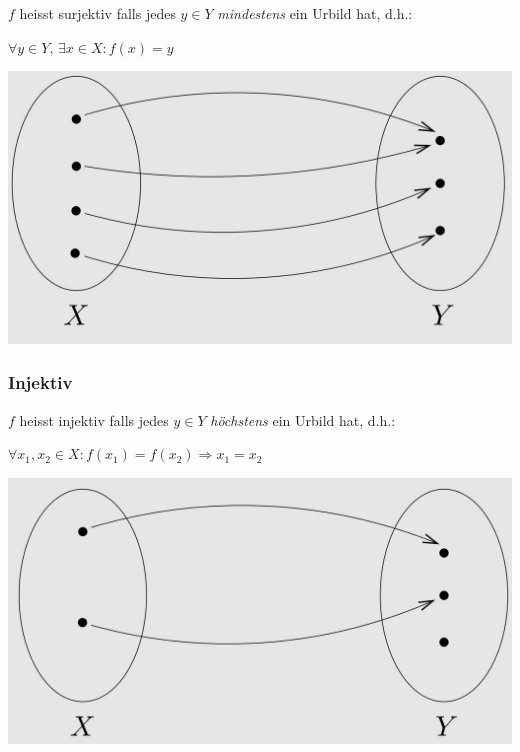 \documentclass[a4paper, fontsize = 8pt, landscape]{scrartcl}
\begin{document}
\begin{multicols*}{3}
\begin{center}
\begin{minipage}{0.5\linewidth}
            $f$ heisst surjektiv falls jedes $y \in Y$ \emph{mindestens} ein Urbild hat, d.h.:
            \begin{center}
                $\forall y \in Y, \, \exists x \in X :  f(x) = y$
            \end{center}
        \end{minipage}
        \begin{minipage}{0.49\linewidth}
            \begin{center}
                \includegraphics[width=0.75\linewidth]{Bilder/Surjektiv.JPG}
            \end{center}
        \end{minipage}
    \end{center}


    \begin{center}
        \begin{minipage}{0.5\linewidth}
            \subsubsection{Injektiv}

            $f$ heisst injektiv falls jedes $y \in Y$ \emph{höchstens} ein Urbild hat, d.h.:

            \begin{center}
                $\forall x_1, x_2 \in X : f(x_1) = f(x_2) \Rightarrow x_1 = x_2$
            \end{center}
        \end{minipage}
        \begin{minipage}{0.49\linewidth}
            \begin{center}
                \includegraphics[width=0.75\linewidth]{Bilder/Injektiv.JPG}
            \end{center}
        \end{minipage}
    \end{center}


\end{multicols*}
\end{document}
